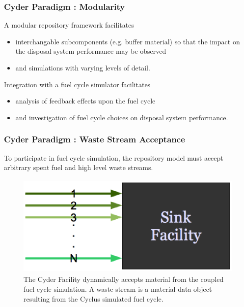 
\begin{frame}[ctb!]
  \frametitle{Cyder Paradigm : Modularity }
  A modular repository framework facilitates 
  \begin{itemize}
    \item  interchangable subcomponents (e.g. buffer material) so that 
      the impact on the disposal system performance may be observed
    \item and simulations with varying levels of detail.
  \end{itemize}
 \pause
  Integration with a fuel cycle simulator facilitates
  \begin{itemize}
    \item analysis of feedback effects upon the fuel cycle
    \item and investigation of fuel cycle choices on disposal system 
      performance.
  \end{itemize}
\end{frame}


\begin{frame}[ctb!]
  \frametitle{Cyder Paradigm : Waste Stream Acceptance}
  \footnotesize{
  
To participate in fuel cycle simulation, the repository model must accept arbitrary 
spent fuel and high level waste streams. 
  \begin{figure}[htbp!]
    \begin{center}
      \includegraphics[height=5cm]{./images/sinkfacility.eps}
    \end{center}
    \caption{ The Cyder Facility dynamically accepts material from the coupled 
    fuel cycle simulation.  A waste stream is a material data object resulting 
    from the Cyclus simulated fuel cycle.  } 
    \label{fig:sinkfacility}
  \end{figure}
}
\end{frame}

